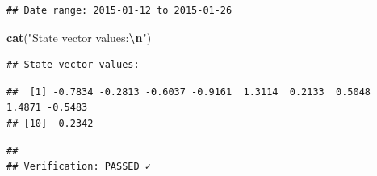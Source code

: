 \documentclass[
]{article}
\newenvironment{Shaded}{\begin{snugshade}}{\end{snugshade}}
\newcommand{\CommentTok}[1]{\textcolor[rgb]{0.56,0.35,0.01}{\textit{#1}}}
\newcommand{\DecValTok}[1]{\textcolor[rgb]{0.00,0.00,0.81}{#1}}
\newcommand{\FunctionTok}[1]{\textcolor[rgb]{0.13,0.29,0.53}{\textbf{#1}}}
\newcommand{\NormalTok}[1]{#1}
\newcommand{\OtherTok}[1]{\textcolor[rgb]{0.56,0.35,0.01}{#1}}
\newcommand{\SpecialCharTok}[1]{\textcolor[rgb]{0.81,0.36,0.00}{\textbf{#1}}}
\newcommand{\StringTok}[1]{\textcolor[rgb]{0.31,0.60,0.02}{#1}}
\begin{document}
\begin{verbatim}
## Date range: 2015-01-12 to 2015-01-26
\end{verbatim}

\begin{Shaded}
\begin{Highlighting}[]
\FunctionTok{cat}\NormalTok{(}\StringTok{"State vector values:}\SpecialCharTok{\textbackslash{}n}\StringTok{"}\NormalTok{)}
\end{Highlighting}
\end{Shaded}

\begin{verbatim}
## State vector values:
\end{verbatim}

\begin{Shaded}
\end{Shaded}

\begin{verbatim}
##  [1] -0.7834 -0.2813 -0.6037 -0.9161  1.3114  0.2133  0.5048  1.4871 -0.5483
## [10]  0.2342
\end{verbatim}

\begin{Shaded}
\end{Shaded}

\begin{verbatim}
## 
## Verification: PASSED ✓
\end{verbatim}
\end{document}
